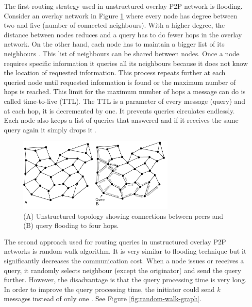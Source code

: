 The first routing strategy used in unstructured overlay P2P network is flooding. Consider an overlay network in Figure \ref{fig:flooding-graph} where every node has degree between two and five (number of connected neighbours). With a higher degree, the distance between nodes reduces and a query has to do fewer hops in the overlay network. On the other hand, each node has to maintain a bigger list of its neighbours \cite{koegel_buford_p2p_2009}. This list of neighbours can be shared between nodes. Once a node requires specific information it queries all its neighbours because it does not know the location of requested information. This process repeats further at each queried node until requested information is found or the maximum number of hops is reached. This limit for the maximum number of hops a message can do is called time-to-live (TTL). The TTL is a parameter of every message (query) and at each hop, it is decremented by one. It prevents queries circulates endlessly. Each node also keeps a list of queries that answered and if it receives the same query again it simply drops it \cite{taylor_p2p_2009}.

\begin{figure}[ht]
	\centering
	\includegraphics[width=0.7\textwidth]{images/flooding-graph.png}
	\caption{\label{fig:flooding-graph}(A) Unstructured topology showing connections between peers and (B) query flooding to four hops. \cite{koegel_buford_p2p_2009}}
\end{figure}

The second approach used for routing queries in unstructured overlay P2P networks is random walk algorithm. It is very similar to flooding technique but it significantly decreases the communication cost. When a node issues or receives a query, it randomly selects neighbour (except the originator) and send the query further. However, the disadvantage is that the query processing time is very long. In order to improve the query processing time, the initiator could send \textit{k} messages instead of only one \cite{vu_peer--peer_2010}. See Figure \ref{fig:random-walk-graph}.


